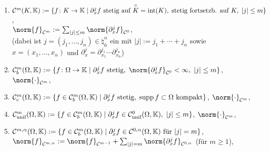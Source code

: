\begin{Bsp}
\begin{enumerate}[label=\emph{(\alph*)}]
        \item
        $\mathcal{C}^m(K, \mathbb{K}) := \{f\colon K \rightarrow \mathbb{K} \;|\;
        \partial_x^j f \text{ stetig auf } \overset{\circ}{K} = \operatorname{int}(K),\;
        \text{stetig fortsetzb. auf } K,\; |j| \le m\}$,\\
        $\norm{f}_{\C^m} := \sum_{|j| \le m} \norm{\partial_x^j f}_{\C^0}$,
        \\
        (dabei ist $j = (j_1, \dotsc, j_n) \in \natural_0^n$ ein 
        mit $|j| := j_1 + \dotsb + j_n$
        sowie $x = (x_1, \dotsc, x_n)$ und
        $\partial_x^j = \partial_{x_1}^{j_1} \dotsb \partial_{x_n}^{j_n}$)

        \item
        $\C^m_b(\Omega, \KK) := \{f\colon \Omega \rightarrow \KK \;|\;
        \partial_x^j f \text{ stetig},\; \norm{\partial_x^j f}_{\C^0} < \infty,\; |j| \le m\}$,
        $\norm{\cdot}_{\C^m}$,\\

        \item
        $\mathcal{C}^m_c(\Omega, \mathbb{K}) := \{f \in \mathcal{C}^m_b(\Omega, \mathbb{K}) \;|\;
        \partial_x^j f \text{ stetig},\; \operatorname{supp} f \subset \Omega \text{ kompakt}\}$,
        $\norm{\cdot}_{\C^m}$,\\

        \item
        $\mathcal{C}^m_{\text{unif}}(\Omega, \mathbb{K}) := \{f \in \mathcal{C}^m_b(\Omega, \mathbb{K}) \;|\;
        \partial_x^j f \in \mathcal{C}^0_{\text{unif}}(\Omega, \mathbb{K}),\; |j| \le m\}$,
        $\norm{\cdot}_{\C^m}$,\\

        \item
        $\mathcal{C}^{m,\alpha}(\Omega, \mathbb{K}) := \{f \in \mathcal{C}^m_b(\Omega, \mathbb{K}) \;|\;
        \partial_x^j f \in \mathcal{C}^{0,\alpha}(\Omega, \mathbb{K}) \text{ für } |j| = m\}$,\\
        $\norm{f}_{\C^{m,\alpha}} := \norm{f}_{\C^{m-1}} +
        \sum_{|j|=m} \norm{\partial_x^j f}_{\C^{0,\alpha}}$ (für $m \ge 1$),\\
    \end{enumerate}
\end{Bsp}

